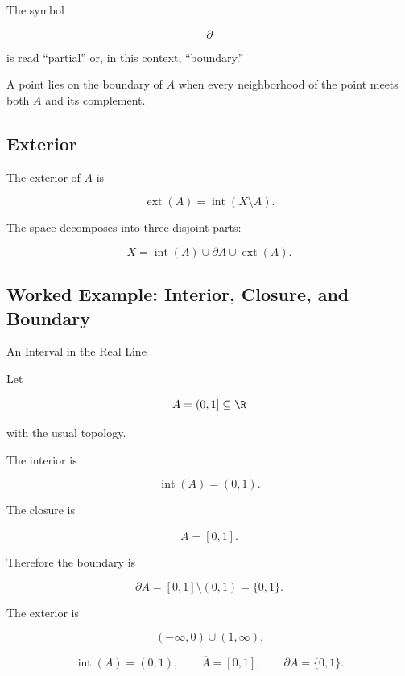 The symbol

\[
\partial
\]

is read ``partial'' or, in this context, ``boundary.''

A point lies on the boundary of \(A\) when every neighborhood of the point
meets both \(A\) and its complement.

\subsection{Exterior}
\label{subsec:topological-exterior}

The exterior of \(A\) is

\[
\boxed{
\operatorname{ext}(A)
=
\operatorname{int}(X\setminus A).
}
\]

The space decomposes into three disjoint parts:

\[
\boxed{
X
=
\operatorname{int}(A)
\cup
\partial A
\cup
\operatorname{ext}(A).
}
\]

\subsection{Worked Example: Interior, Closure, and Boundary}
\label{subsec:worked-interior-closure-boundary}

\begin{workedexamplebox}{An Interval in the Real Line}

Let

\[
A=(0,1]
\subseteq\R
\]

with the usual topology.

The interior is

\[
\operatorname{int}(A)
=
(0,1).
\]

The closure is

\[
\overline{A}
=
[0,1].
\]

Therefore the boundary is

\[
\partial A
=
[0,1]\setminus(0,1)
=
\{0,1\}.
\]

The exterior is

\[
(-\infty,0)\cup(1,\infty).
\]

\begin{answerbox}
\[
\boxed{
\operatorname{int}(A)=(0,1),
\qquad
\overline{A}=[0,1],
\qquad
\partial A=\{0,1\}.
}
\]
\end{answerbox}
\end{workedexamplebox}

